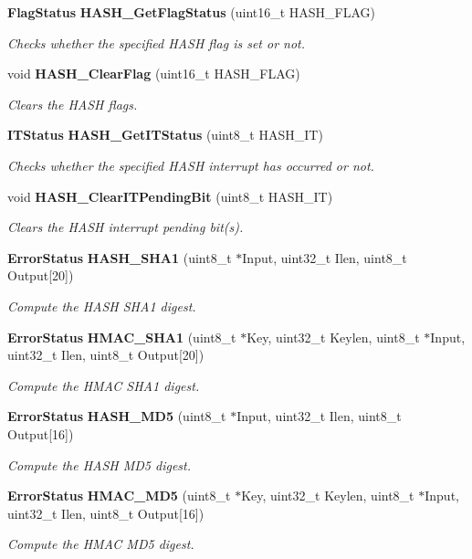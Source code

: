 \begin{DoxyCompactItemize}
\textbf{ Flag\+Status} \textbf{ H\+A\+S\+H\+\_\+\+Get\+Flag\+Status} (uint16\+\_\+t H\+A\+S\+H\+\_\+\+F\+L\+AG)
\begin{DoxyCompactList}\small\item\em Checks whether the specified H\+A\+SH flag is set or not. \end{DoxyCompactList}\item 
void \textbf{ H\+A\+S\+H\+\_\+\+Clear\+Flag} (uint16\+\_\+t H\+A\+S\+H\+\_\+\+F\+L\+AG)
\begin{DoxyCompactList}\small\item\em Clears the H\+A\+SH flags. \end{DoxyCompactList}\item 
\textbf{ I\+T\+Status} \textbf{ H\+A\+S\+H\+\_\+\+Get\+I\+T\+Status} (uint8\+\_\+t H\+A\+S\+H\+\_\+\+IT)
\begin{DoxyCompactList}\small\item\em Checks whether the specified H\+A\+SH interrupt has occurred or not. \end{DoxyCompactList}\item 
void \textbf{ H\+A\+S\+H\+\_\+\+Clear\+I\+T\+Pending\+Bit} (uint8\+\_\+t H\+A\+S\+H\+\_\+\+IT)
\begin{DoxyCompactList}\small\item\em Clears the H\+A\+SH interrupt pending bit(s). \end{DoxyCompactList}\item 
\textbf{ Error\+Status} \textbf{ H\+A\+S\+H\+\_\+\+S\+H\+A1} (uint8\+\_\+t $\ast$Input, uint32\+\_\+t Ilen, uint8\+\_\+t Output[20])
\begin{DoxyCompactList}\small\item\em Compute the H\+A\+SH S\+H\+A1 digest. \end{DoxyCompactList}\item 
\textbf{ Error\+Status} \textbf{ H\+M\+A\+C\+\_\+\+S\+H\+A1} (uint8\+\_\+t $\ast$Key, uint32\+\_\+t Keylen, uint8\+\_\+t $\ast$Input, uint32\+\_\+t Ilen, uint8\+\_\+t Output[20])
\begin{DoxyCompactList}\small\item\em Compute the H\+M\+AC S\+H\+A1 digest. \end{DoxyCompactList}\item 
\textbf{ Error\+Status} \textbf{ H\+A\+S\+H\+\_\+\+M\+D5} (uint8\+\_\+t $\ast$Input, uint32\+\_\+t Ilen, uint8\+\_\+t Output[16])
\begin{DoxyCompactList}\small\item\em Compute the H\+A\+SH M\+D5 digest. \end{DoxyCompactList}\item 
\textbf{ Error\+Status} \textbf{ H\+M\+A\+C\+\_\+\+M\+D5} (uint8\+\_\+t $\ast$Key, uint32\+\_\+t Keylen, uint8\+\_\+t $\ast$Input, uint32\+\_\+t Ilen, uint8\+\_\+t Output[16])
\begin{DoxyCompactList}\small\item\em Compute the H\+M\+AC M\+D5 digest. \end{DoxyCompactList}\end{DoxyCompactItemize}


